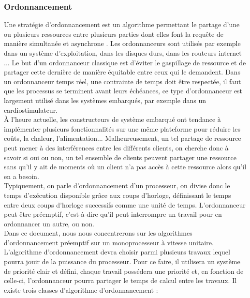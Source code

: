 \documentclass[a4paper]{report}
\theoremstyle{break}
\begin{document}
\subsubsection{Ordonnancement}
Une stratégie d'ordonnancement est un algorithme permettant le partage d'une ou plusieurs ressources entre plusieurs parties dont elles font la requête de manière simultanée et asynchrone \cite{goossens2014os}. Les ordonnanceurs sont utilisés par exemple dans un système d'exploitation, dans les disques durs, dans les routeurs internet ... Le but d'un ordonnanceur classique est d'éviter le gaspillage de ressource et de partager cette dernière de manière équitable entre ceux qui le demandent. Dans un ordonnanceur temps réel, une contrainte de temps doit être respectée, il faut que les processus se terminent avant leurs échéances, ce type d'ordonnanceur est largement utilisé dans les systèmes embarqués, par exemple dans un cardiostimulateur.\\

À l'heure actuelle, les constructeurs de système embarqué ont tendance à implémenter plusieurs fonctionnalités sur une même plateforme pour réduire les coûts, la chaleur, l'alimentation... Malheureusement, un tel partage de ressource peut mener à des interférences entre les différents clients, on cherche donc à savoir si oui ou non, un tel ensemble de clients peuvent partager une ressource sans qu'il y ait de moments où un client n'a pas accès à cette ressource alors qu'il en a besoin.\\
Typiquement, on parle d'ordonnancement d'un processeur, on divise donc le temps d'exécution disponible grâce aux coups d'horloge, définissant le temps entre deux coups d'horloge successifs comme une unité de temps. L'ordonnanceur peut être préemptif, c'est-à-dire qu'il peut interrompre un travail pour en ordonnancer un autre, ou non.\\

Dans ce document, nous nous concentrerons sur les algorithmes d'ordonnancement préemptif sur un monoprocesseur à vitesse unitaire.\\

L'algorithme d'ordonnancement devra choisir parmi plusieurs travaux lequel pourra jouir de la puissance du processeur.  Pour ce faire, il utilisera un système de priorité clair et défini, chaque travail possédera une priorité et, en fonction de celle-ci, l'ordonnanceur pourra partager le temps de calcul entre les travaux. Il existe trois classes d'algorithme d'ordonnancement \cite{goossens2014os} :
\end{document}
